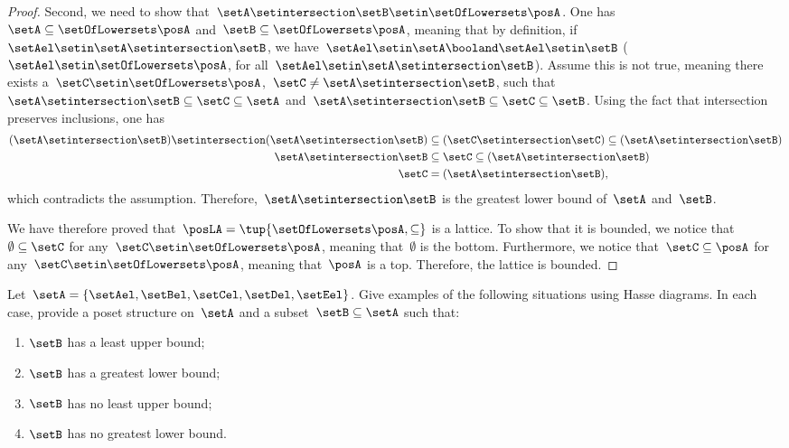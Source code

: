 \begin{proof}
    Second, we need to show that~$\setA \setintersection \setB\setin \setOfLowersets \posA$.
    One has~$\setA \subseteq \setOfLowersets \posA$ and~$\setB\subseteq \setOfLowersets \posA$, meaning that by definition, if~$\setAel\setin \setA\setintersection \setB$, we have~$\setAel \setin \setA\booland \setAel\setin \setB$ ($\setAel\setin \setOfLowersets \posA$, for all~$\setAel\setin \setA \setintersection \setB$).
    Assume this is not true, meaning there exists a~$\setC\setin \setOfLowersets \posA$,~$\setC\neq \setA\setintersection \setB$, such that~$\setA\setintersection \setB\subseteq \setC\subseteq \setA$ and~$\setA\setintersection \setB\subseteq \setC\subseteq \setB$.
    Using the fact that intersection preserves inclusions, one has
    \begin{equation}
        \begin{aligned}
            (\setA\setintersection \setB)
            \setintersection (\setA\setintersection \setB) & \subseteq (\setC \setintersection \setC) \subseteq (\setA\setintersection \setB) \\
            \setA\setintersection \setB                    & \subseteq \setC\subseteq (\setA\setintersection \setB) \\
            \setC                                          & =(\setA\setintersection \setB),
        \end{aligned}
    \end{equation}
    which contradicts the assumption.
    Therefore,~$\setA\setintersection \setB$ is the greatest lower bound of~$\setA$ and~$\setB$.

    We have therefore proved that~$\posLA=\tup{\setOfLowersets \posA,\subseteq}$ is a lattice.
    To show that it is bounded, we notice that~$\emptyset \subseteq \setC$ for any~$\setC\setin \setOfLowersets \posA$, meaning that~$\emptyset$ is the bottom.
    Furthermore, we notice that~$\setC\subseteq \posA$ for any~$\setC\setin \setOfLowersets \posA$, meaning that~$\posA$ is a top.
    Therefore, the lattice is bounded.
\end{proof}

\vfill

\begin{gradedexercise}
    \label{ex:UpperLowerBounds}
    Let~$\setA = \{\setAel, \setBel, \setCel, \setDel, \setEel \}$.
    Give examples of the following situations using Hasse diagrams.
    In each case, provide a poset structure on~$\setA$ and a subset~$\setB \subseteq \setA$ such that:
    \begin{enumerate}
        \item $\setB$ has a least upper bound;
        \item $\setB$ has a greatest lower bound;
        \item $\setB$ has no least upper bound;
        \item $\setB$ has no greatest lower bound.
    \end{enumerate}
\end{gradedexercise}

